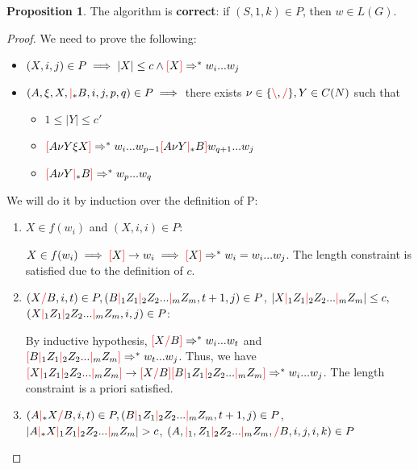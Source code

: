 \documentclass[12pt]{extarticle}
\theoremstyle{definition} \newtheorem{defn}{Definition}
\theoremstyle{definition} \newtheorem{prop}{Proposition}
\newcommand{\lc}{\textcolor{red}{\backslash}}
\newcommand{\rc}{\textcolor{red}{/}}
\newcommand{\mc}{\textcolor{red}{|}}
\newcommand{\lb}{\textcolor{red}{[}}
\newcommand{\rb}{\textcolor{red}{]}}
\begin{document}
\begin{prop}
    The algorithm is \textbf{correct}: if $(S, 1, k) \in P$, then $w \in L(G)$.
\end{prop}
\begin{proof}
    We need to prove the following:

    \begin{itemize}
        \item $(X, i, j) \in P \implies |X| \leq c \land \lb X \rb \Rightarrow^* w_i ... w_j$
        \item $(A, \xi, X, \mc_* B, i, j, p, q) \in P \implies$
            there exists $\nu \in \{ \lc, \rc \}, Y \in C(N)$ such that
            \begin{itemize}
                \item $1 \leq |Y| \leq c'$
                \item $\lb A \nu Y \xi X \rb \Rightarrow^* w_i ... w_{p - 1} \lb A \nu Y \mc_* B \rb w_{q + 1} ... w_j$
                \item $\lb A \nu Y \mc_* B \rb \Rightarrow^* w_p ... w_q$
            \end{itemize}
    \end{itemize}

    We will do it by induction over the definition of P:

    \begin{enumerate}
    \item $X \in f(w_i)$ and $(X, i, i) \in P$:

        $X \in f(w_i) \implies \lb X \rb \rightarrow w_i \implies \lb X \rb \Rightarrow^* w_i = w_i ... w_j$.
        The length constraint is satisfied due to the definition of $c$.

    \item $(X \rc B, i, t) \in P, (B \mc_1 Z_1 \mc_2 Z_2 ... \mc_m Z_m, t + 1, j) \in P$,
        $|X \mc_1 Z_1 \mc_2 Z_2 ... \mc_m Z_m| \leq c,$
        $(X \mc_1 Z_1 \mc_2 Z_2 ... \mc_m Z_m, i, j) \in P$:

        By inductive hypothesis, $\lb X \rc B \rb \Rightarrow^* w_i ... w_t$
        and $\lb B \mc_1 Z_1 \mc_2 Z_2 ... \mc_m Z_m \rb \Rightarrow^* w_t ... w_j$.
        Thus, we have $\lb X \mc_1 Z_1 \mc_2 Z_2 ... \mc_m Z_m \rb \rightarrow
        \lb X \rc B \rb \lb B \mc_1 Z_1 \mc_2 Z_2 ... \mc_m Z_m \rb
        \Rightarrow^* w_i ... w_j$. The length constraint is a priori satisfied.

    \item $(A \mc_* X \rc B, i, t) \in P, (B \mc_1 Z_1 \mc_2 Z_2 ... \mc_m Z_m, t + 1, j) \in P$,
        $|A \mc_* X \mc_1 Z_1 \mc_2 Z_2 ... \mc_m Z_m| > c$,
        $(A, \mc_1, Z_1 \mc_2 Z_2 ... \mc_m Z_m, \rc B, i, j, i, k) \in P$


\end{enumerate}
\end{proof}
\end{document}
